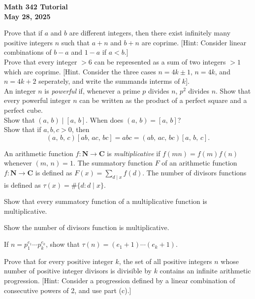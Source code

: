 \documentclass[a4paper,11pt]{article}
\theoremstyle{mythm}
\theoremstyle{mydef}
\newcommand{\C}{\mathbf{C}}
\newcommand{\N}{\mathbf{N}}
\begin{document}
\begin{center}
  {\Large\bfseries Math 342 Tutorial} \\
  {\normalsize\bf May 28, 2025}
\end{center}

 Prove that if $a$ and $b$ are different integers,
then there exist infinitely many positive integers $n$ such that $a+n$ and $b+n$
are coprime. [Hint: Consider linear combinations of $b-a$ and $1-a$ if $a<b$.] \\

 Prove that every integer $>6$ can be represented as a
sum of two integers $>1$ which are coprime. [Hint. Consider the three cases
$n=4k \pm 1$, $n=4k$, and $n=4k+2$ seperately, and write the summands interms of
$k$]. \\

 An integer $n$ is {\it powerful} if, whenever a prime
$p$ divides $n$, $p^2$ divides $n$. Show that every powerful integer $n$ can be
written as the product of a perfect square and a perfect cube. \\

 Show that $(a,\,b) \mid [a,\,b]$. When does
$(a,\,b)=[a,\,b]$?  \\

 Show that if $a,b,c > 0$, then
\[
  (a,\,b,\,c)[ab,\,ac,\,bc] = abc = (ab,\,ac,\,bc)[a,\,b,\,c].
\]

 An arithmetic function $f: \N\rightarrow\C$ is {\it
  multiplicative} if $f(mn)=f(m)f(n)$ whenever $(m,\,n)=1$. The summatory
function $F$ of an arithmetic function $f:\N\rightarrow\C$ is defined as
$F(x)=\sum_{d \mid x}f(d)$. The number of divisors functions is defined as
$\tau(x)=\#\{d : d \mid x\}$.
\begin{enumerate*}[{\bf (a)}]
\item Show that every summatory function of a multiplicative function is
  multiplicative.
\item Show the number of divisors function is multiplicative.
\item If $n=p_1^{e_1}\cdots p_k^{e_k}$, show that $\tau(n)=(e_1+1) \cdots (e_k+1)$.
\item Prove that for every positive integer $k$, the set of all positive
  integers $n$ whose number of positive integer divisors is divisible by $k$
  contains an infinite arithmetic progression. [Hint: Consider a progression
  defined by a linear combination of consecutive powers of 2, and use part (c).]\\
\end{enumerate*}
\end{document}
